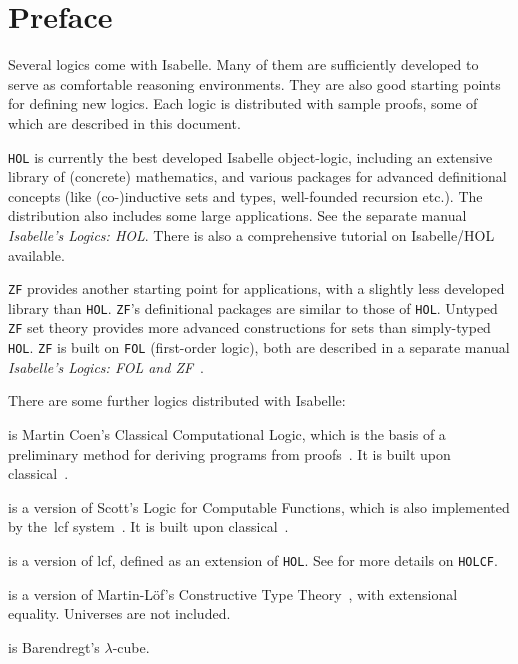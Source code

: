 \chapter*{Preface}
Several logics come with Isabelle.  Many of them are sufficiently developed
to serve as comfortable reasoning environments.  They are also good
starting points for defining new logics.  Each logic is distributed with
sample proofs, some of which are described in this document.

\texttt{HOL} is currently the best developed Isabelle object-logic, including
an extensive library of (concrete) mathematics, and various packages for
advanced definitional concepts (like (co-)inductive sets and types,
well-founded recursion etc.). The distribution also includes some large
applications.  See the separate manual \emph{Isabelle's Logics: HOL}.  There
is also a comprehensive tutorial on Isabelle/HOL available.

\texttt{ZF} provides another starting point for applications, with a slightly
less developed library than \texttt{HOL}.  \texttt{ZF}'s definitional packages
are similar to those of \texttt{HOL}. Untyped \texttt{ZF} set theory provides
more advanced constructions for sets than simply-typed \texttt{HOL}.
\texttt{ZF} is built on \texttt{FOL} (first-order logic), both are described
in a separate manual \emph{Isabelle's Logics: FOL and ZF}~\cite{isabelle-ZF}.

\medskip There are some further logics distributed with Isabelle:
\begin{ttdescription}
\item[\thydx{CCL}] is Martin Coen's Classical Computational Logic,
  which is the basis of a preliminary method for deriving programs from
  proofs~\cite{coen92}.  It is built upon classical~\FOL{}.
 
\item[\thydx{LCF}] is a version of Scott's Logic for Computable
  Functions, which is also implemented by the~{\sc lcf}
  system~\cite{paulson87}.  It is built upon classical~\FOL{}.
  
\item[\thydx{HOLCF}] is a version of {\sc lcf}, defined as an extension of
  \texttt{HOL}\@. See \cite{MuellerNvOS99} for more details on \texttt{HOLCF}.
 
\item[\thydx{CTT}] is a version of Martin-L\"of's Constructive Type
Theory~\cite{nordstrom90}, with extensional equality.  Universes are not
included.

\item[\thydx{Cube}] is Barendregt's $\lambda$-cube.
 \end{ttdescription}

